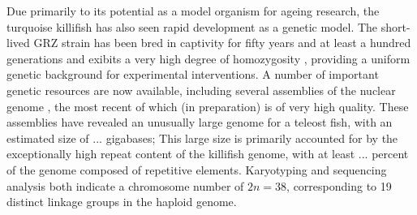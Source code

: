 Due primarily to its potential as a model organism for ageing research, the turquoise killifish has also seen rapid development as a genetic model. The short-lived GRZ strain has been bred in captivity for fifty years and at least a hundred generations \parencite{terzibasi2007review} and exibits a very high degree of homozygosity \parencite{reichwald2009genome,valenzano2009map,kirschner2012map}, providing a uniform genetic background for experimental interventions. A number of important genetic resources are now available, including several assemblies of the nuclear genome \parencite{reichwald2015genome,valenzano2015genome}, the most recent of which (in preparation) is of very high quality. These assemblies have revealed an unusually large genome for a teleost fish, with an estimated size of ... gigabases; %
This large size is primarily accounted for by the exceptionally high repeat content of the killifish genome, with at least ... percent of the genome composed of repetitive elements. %
Karyotyping \parencite{reichwald2009genome} and sequencing analysis \parencite{reichwald2015genome} both indicate a chromosome number of $2n = 38$, corresponding to 19 distinct linkage groups in the haploid genome.


%

